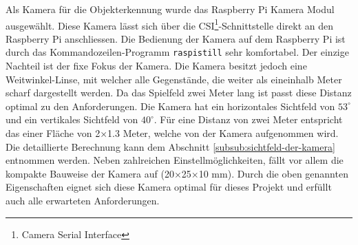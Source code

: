 Als Kamera für die Objekterkennung wurde das Raspberry Pi Kamera Modul ausgewählt. Diese Kamera lässt sich über die CSI\footnote{Camera Serial Interface}-Schnittstelle direkt an den Raspberry Pi anschliessen. Die Bedienung der Kamera auf dem Raspberry Pi ist durch das Kommandozeilen-Programm \verb|raspistill| sehr komfortabel. Der einzige Nachteil ist der fixe Fokus der Kamera. Die Kamera besitzt jedoch eine Weitwinkel-Linse, mit welcher alle Gegenstände, die weiter als eineinhalb Meter scharf dargestellt werden. Da das Spielfeld zwei Meter lang ist passt diese Distanz optimal zu den Anforderungen. Die Kamera hat ein horizontales Sichtfeld von $53^\circ$ und ein vertikales Sichtfeld von $40^\circ$. Für eine Distanz von zwei Meter entspricht das einer Fläche von 2×1.3 Meter, welche von der Kamera aufgenommen wird. Die detaillierte Berechnung kann dem Abschnitt \ref{subsub:sichtfeld-der-kamera} entnommen werden. Neben zahlreichen Einstellmöglichkeiten, fällt vor allem die kompakte Bauweise der Kamera auf (20×25×10 mm). Durch die oben genannten Eigenschaften eignet sich diese Kamera optimal für dieses Projekt und erfüllt auch alle erwarteten Anforderungen.
